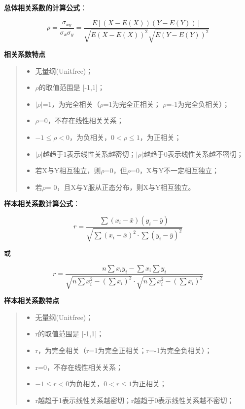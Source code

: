 \documentclass[]{ctexbook}
\providecommand{\tightlist}{%
  \setlength{\itemsep}{0pt}\setlength{\parskip}{0pt}}
\begin{document}
\textbf{总体相关系数的计算公式}：

\[\rho=\frac{\sigma_{xy}}{\sigma_x\sigma_y}=\frac{E[(X-E(X))(Y-E(Y))]}{\sqrt{E(X-E(X))^2}\sqrt{E(Y-E(Y))^2}}\]

\textbf{相关系数特点}

\begin{quote}
\begin{itemize}
\tightlist
\item
  无量纲(Unitfree)；
\item
  \(\rho\)的取值范围是 {[}-1,1{]}；
\item
  \(|\rho|\)=1，为完全相关（\(\rho\)=1为完全正相关； \(\rho\)=-1为完全负相关）；
\item
  \(\rho\)=0，不存在线性相关关系；
\item
  \(-1\leq \rho<0\)，为负相关，\(0<\rho \leq 1\)，为正相关；
\item
  \(|\rho|\)越趋于1表示线性关系越密切；\(|\rho|\)越趋于0表示线性关系越不密切；
\item
  若X与Y相互独立，则\(\rho\)=0，但\(\rho\)=0，X与Y不一定相互独立；
\item
  若\(\rho\)= 0，且X与Y服从正态分布，则X与Y相互独立。
\end{itemize}
\end{quote}

\textbf{样本相关系数计算公式}：

\[r=\frac{\sum(x_i-\bar x)(y_i-\bar y)}{\sqrt{\sum(x_i-\bar x)^2\cdot\sum(y_i-\bar y)^2}}\]

或

\[r=\frac{n\sum x_iy_i-\sum x_i\sum y_i}{\sqrt{n\sum x_i^2-(\sum x_i)^2}\cdot\sqrt{n\sum x_i^2-(\sum x_i)^2}}\]

\textbf{样本相关系数特点}

\begin{quote}
\begin{itemize}
\tightlist
\item
  无量纲(Unitfree)；
\item
  r的取值范围是 {[}-1,1{]}；
\item
  \textbar r，为完全相关（r=1为完全正相关；r=-1为完全负相关）；
\item
  r=0，不存在线性相关关系；
\item
  \(-1\leq r<0\)为负相关，\(0<r\leq1\)为正相关；
\item
  \textbar r\textbar 越趋于1表示线性关系越密切；\textbar r\textbar 越趋于0表示线性关系越不密切；
\end{itemize}
\end{quote}
\end{document}

